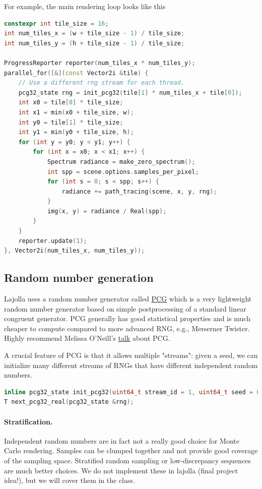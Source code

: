 For example, the main rendering loop looks like this
\begin{lstlisting}[language=c++]
constexpr int tile_size = 16;
int num_tiles_x = (w + tile_size - 1) / tile_size;
int num_tiles_y = (h + tile_size - 1) / tile_size;

ProgressReporter reporter(num_tiles_x * num_tiles_y);
parallel_for([&](const Vector2i &tile) {
    // Use a different rng stream for each thread.
    pcg32_state rng = init_pcg32(tile[1] * num_tiles_x + tile[0]);
    int x0 = tile[0] * tile_size;
    int x1 = min(x0 + tile_size, w);
    int y0 = tile[1] * tile_size;
    int y1 = min(y0 + tile_size, h);
    for (int y = y0; y < y1; y++) {
        for (int x = x0; x < x1; x++) {
            Spectrum radiance = make_zero_spectrum();
            int spp = scene.options.samples_per_pixel;
            for (int s = 0; s < spp; s++) {
                radiance += path_tracing(scene, x, y, rng);
            }
            img(x, y) = radiance / Real(spp);
        }
    }
    reporter.update(1);
}, Vector2i(num_tiles_x, num_tiles_y));
\end{lstlisting}

\subsection{Random number generation}
Lajolla uses a random number generator called \href{https://www.pcg-random.org/}{PCG} which is a very lightweight random number generator based on simple postprocessing of a standard linear congruent generator. PCG generally has good statistical properties and is much cheaper to compute compared to more advanced RNG, e.g., Merserner Twister. Highly recommend Melissa O'Neill's \href{https://www.youtube.com/watch?v=45Oet5qjlms}{talk} about PCG.

A crucial feature of PCG is that it allows multiple "streams": given a seed, we can initialize many different streams of RNGs that have different independent random numbers.

\begin{lstlisting}[language=c++]
inline pcg32_state init_pcg32(uint64_t stream_id = 1, uint64_t seed = 0x853c49e6748fea9bULL);
T next_pcg32_real(pcg32_state &rng);
\end{lstlisting}

\paragraph{Stratification.} Independent random numbers are in fact not a really good choice for Monte Carlo rendering. Samples can be clumped together and not provide good coverage of the sampling space. Stratified random sampling or low-discrepancy sequences are much better choices. We do not implement these in lajolla (final project idea!), but we will cover them in the class.

